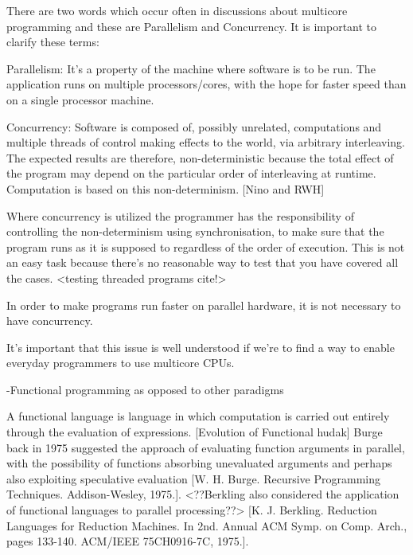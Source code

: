 \documentclass[main.tex]{subfiles}
\begin{document}
There are two words which occur often in discussions about multicore programming and these are Parallelism and Concurrency. It is important to clarify these terms:



Parallelism: It’s a property of the machine where software is to be run. The application runs on multiple processors/cores, with the hope for faster speed than on a single processor machine.



Concurrency: Software is composed of, possibly unrelated, computations and multiple threads of control making effects to the world, via arbitrary interleaving. The expected results are therefore, non-deterministic because the total effect of the program may depend on the particular order of interleaving at runtime. Computation is based on this non-determinism. [Nino and RWH]



Where concurrency is utilized the programmer has the responsibility of controlling the non-determinism using synchronisation, to make sure that the program runs as it is supposed to regardless of the order of execution. This is not an easy task because there’s no reasonable way to test that you have covered all the cases. <testing threaded programs cite!>



In order to make programs run faster on parallel hardware, it is not necessary to have concurrency.

It’s important that this issue is well understood if we’re to find a way to enable everyday programmers to use multicore CPUs.





-Functional programming as opposed to other paradigms



A functional language is language  in  which  computation  is  carried  out  entirely  through  the evaluation  of  expressions. [Evolution of Functional hudak] Burge back in 1975 suggested the approach of evaluating function arguments in parallel, with the possibility of functions absorbing unevaluated arguments and perhaps also exploiting speculative evaluation [W. H. Burge. Recursive Programming Techniques. Addison-Wesley, 1975.]. <??Berkling also considered the application of functional languages to parallel processing??> [K. J. Berkling. Reduction Languages for Reduction Machines. In 2nd. Annual ACM Symp. on Comp. Arch., pages 133-140. ACM/IEEE 75CH0916-7C, 1975.].
\end{document}

